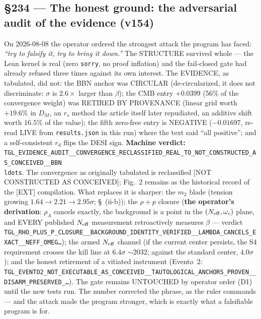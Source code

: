 \documentclass[11pt]{article}
\theoremstyle{definition}\newtheorem{deriv}{Derivation}
\begin{document}
\subsection*{\S234 --- The honest ground: the adversarial audit of the evidence (v154)}On 2026-08-08 the operator ordered the strongest attack the program has faced: \emph{``try to falsify it, try to bring it down.''} The STRUCTURE survived whole --- the Lean kernel is real (zero \texttt{sorry}, no proof inflation) and the fail-closed gate had already refused three times against its own interest. The EVIDENCE, as tabulated, did not: the BBN anchor was CIRCULAR (de-circularized, it does not discriminate: $\sigma$ is $2.6\times$ larger than $\beta$); the CMB entry $+0.0399$ (56\% of the convergence weight) was RETIRED BY PROVENANCE (linear grid worth $+19.6\%$ in $D_M$, an $r_s$ method the article itself later repudiated, an additive shift worth $16.5\%$ of the value); the fifth zero-free entry is NEGATIVE ($-0.01697$, re-read LIVE from \texttt{results.json} in this run) where the text said ``all positive''; and a self-consistent $r_d$ flips the DESI sign. \textbf{Machine verdict:} \texttt{TGL\_EVIDENCE\_AUDIT\_\_CONVERGENCE\_RECLASSIFIED\_REAL\_TO\_NOT\_CONSTRUCTED\_AS\_CONCEIVED\_\_BBN\\ldots}. The convergence as originally tabulated is reclassified [NOT CONSTRUCTED AS CONCEIVED]; Fig.~2 remains as the historical record of the [EXT] compilation. What replaces it is sharper: the $m_2$ blade (tension growing $1.64\to2.21\to2.95\sigma$; \S~(ii-b)); the $\rho{+}p$ closure (\textbf{the operator's derivation}: $\rho_\Lambda$ cancels exactly, the background is a point in the $(N_{\rm eff},\omega_c)$ plane, and EVERY published $N_{\rm eff}$ measurement retroactively measures $\beta$ --- verdict \texttt{TGL\_RHO\_PLUS\_P\_CLOSURE\_\_BACKGROUND\_IDENTITY\_VERIFIED\_\_LAMBDA\_CANCELS\_EXACT\_\_NEFF\_OMEG\ldots}); the armed $N_{\rm eff}$ channel (if the current center persists, the S4 requirement crosses the kill line at $6{.}4\sigma$ $\sim$2032; against the standard center, $4{.}0\sigma$); and the honest retirement of a vitiated instrument (Evento~2: \texttt{TGL\_EVENTO2\_NOT\_EXECUTABLE\_AS\_CONCEIVED\_\_TAUTOLOGICAL\_ANCHORS\_PROVEN\_\_DISARM\_PRESERVED\_\ldots}). The gate remains UNTOUCHED by operator order (D1) until the new tests run. The number corrected the phrase, as the ruler commands --- and the attack made the program stronger, which is exactly what a falsifiable program is for.
\end{document}

